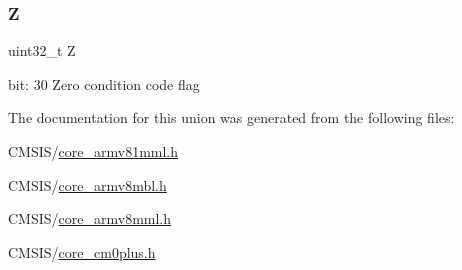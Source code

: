 \subsubsection{\texorpdfstring{Z}{Z}}
{\footnotesize\ttfamily uint32\+\_\+t Z}

bit\+: 30 Zero condition code flag 

The documentation for this union was generated from the following files\+:\begin{DoxyCompactItemize}
\item 
C\+M\+S\+I\+S/\mbox{\hyperlink{core__armv81mml_8h}{core\+\_\+armv81mml.\+h}}\item 
C\+M\+S\+I\+S/\mbox{\hyperlink{core__armv8mbl_8h}{core\+\_\+armv8mbl.\+h}}\item 
C\+M\+S\+I\+S/\mbox{\hyperlink{core__armv8mml_8h}{core\+\_\+armv8mml.\+h}}\item 
C\+M\+S\+I\+S/\mbox{\hyperlink{core__cm0plus_8h}{core\+\_\+cm0plus.\+h}}\end{DoxyCompactItemize}
